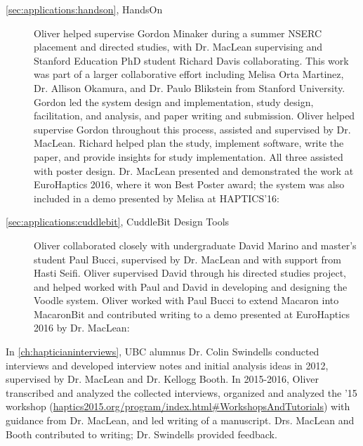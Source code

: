 \begin{description}
\item[\autoref{sec:applications:handson}, HandsOn] Oliver helped supervise Gordon Minaker during a summer NSERC placement and directed studies, with Dr. MacLean supervising and Stanford Education PhD student Richard Davis collaborating.
This work was part of a larger collaborative effort including Melisa Orta Martinez, Dr. Allison Okamura, and Dr. Paulo Blikstein from Stanford University.
Gordon led the system design and implementation, study design, facilitation, and analysis, and paper writing and submission.
Oliver helped supervise Gordon throughout this process, assisted and supervised by Dr. MacLean.
Richard helped plan the study, implement software, write the paper, and provide insights for study implementation.
All three assisted with poster design.
 Dr. MacLean presented and demonstrated the work at EuroHaptics 2016, where it won Best Poster award; the system was also included in a demo presented by Melisa at HAPTICS'16:



\item[\autoref{sec:applications:cuddlebit}, CuddleBit Design Tools] Oliver collaborated closely with undergraduate David Marino and master's student Paul Bucci, supervised by Dr. MacLean and with support from Hasti Seifi.
Oliver supervised David through his directed studies project, and helped worked with Paul and David in developing and designing the Voodle system.
Oliver worked with Paul Bucci to extend Macaron into MacaronBit and contributed writing to a demo presented at EuroHaptics 2016 by Dr. MacLean:


\end{description}

\noindent
In \autoref{ch:hapticianinterviews}, UBC alumnus Dr. Colin Swindells conducted interviews and developed interview notes and initial analysis ideas in 2012, supervised by Dr. MacLean and Dr. Kellogg Booth.
In 2015-2016, Oliver transcribed and analyzed the collected interviews, organized and analyzed the \haxd '15 workshop (\url{haptics2015.org/program/index.html#WorkshopsAndTutorials}) with guidance from Dr. MacLean, and led writing of a manuscript.
Drs. MacLean and Booth contributed to writing; Dr. Swindells provided feedback.

\nocite{Schneider2015haxdworkshop}

